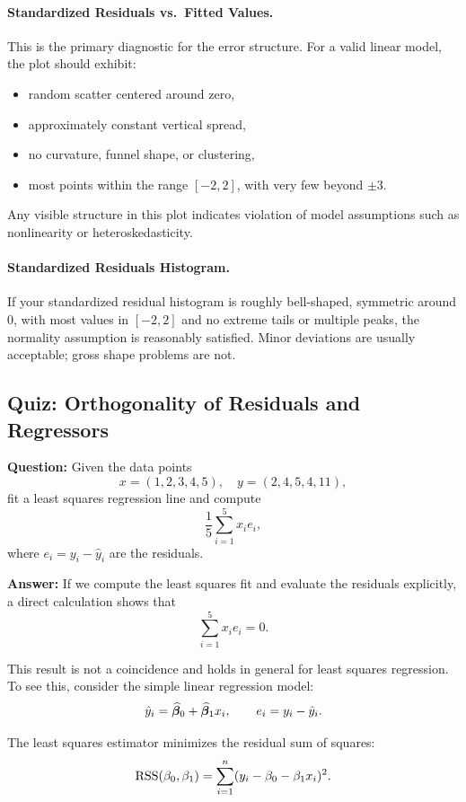 \paragraph{Standardized Residuals vs.\ Fitted Values.}
This is the primary diagnostic for the error structure. For a valid linear model, the plot should exhibit:
\begin{itemize}
  \item random scatter centered around zero,
  \item approximately constant vertical spread,
  \item no curvature, funnel shape, or clustering,
  \item most points within the range $[-2,2]$, with very few beyond $\pm 3$.
\end{itemize}

Any visible structure in this plot indicates violation of model assumptions such as nonlinearity or heteroskedasticity.

\paragraph{Standardized Residuals Histogram.}
If your standardized residual histogram is roughly bell-shaped, symmetric around 0, with most values in $[-2, 2]$ and no extreme tails or multiple peaks, the normality assumption is reasonably satisfied. Minor deviations are usually acceptable; gross shape problems are not.

\subsection{Quiz: Orthogonality of Residuals and Regressors}

\textbf{Question:}
Given the data points
\[
x = (1,2,3,4,5), \quad y = (2,4,5,4,11),
\]
fit a least squares regression line and compute
\[
\frac{1}{5}\sum_{i=1}^5 x_i e_i,
\]
where $e_i = y_i - \hat{y}_i$ are the residuals.

\textbf{Answer:}
If we compute the least squares fit and evaluate the residuals explicitly, a direct calculation shows that
\[
\sum_{i=1}^5 x_i e_i = 0.
\]

This result is not a coincidence and holds in general for least squares regression. To see this, consider the simple linear regression model:
\[
\hat{y}_i = \widehat{\boldsymbol{\beta}}_0 + \widehat{\boldsymbol{\beta}}_1 x_i,
\qquad
e_i = y_i - \hat{y}_i.
\]

The least squares estimator minimizes the residual sum of squares:
\[
\mathrm{RSS}(\beta_0,\beta_1)
= \sum_{i=1}^n (y_i - \beta_0 - \beta_1 x_i)^2.
\]

